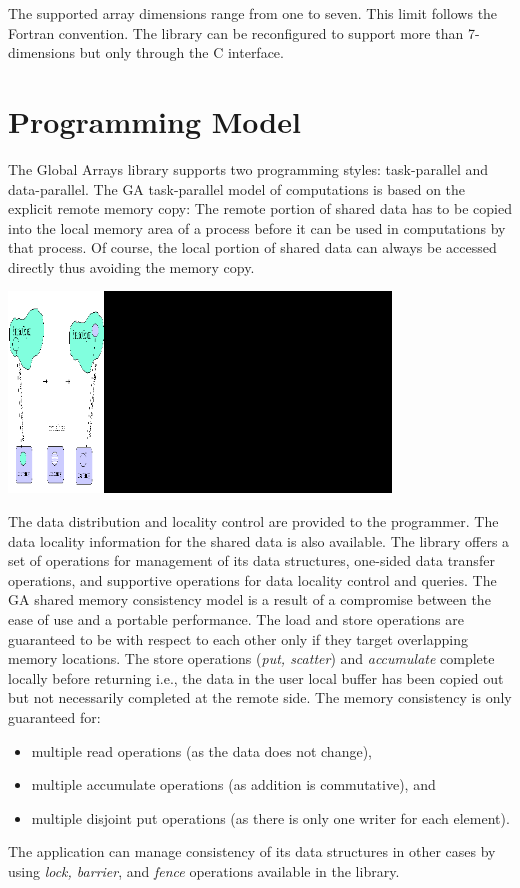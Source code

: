 The supported array dimensions range from one to seven. This limit
follows the Fortran convention. The library can be reconfigured to
support more than 7-dimensions but only through the C interface. 


\section{Programming Model}

The Global Arrays library supports two programming styles: task-parallel
and data-parallel. The GA task-parallel model of computations is based
on the explicit remote memory copy: The remote portion of shared data
has to be copied into the local memory area of a process before it
can be used in computations by that process. Of course, the \textquotedbl{}local\textquotedbl{}
portion of shared data can always be accessed directly thus avoiding
the memory copy. 

\includegraphics[width=4in]{mod}

The data distribution and locality control are provided to the programmer.
The data locality information for the shared data is also available.
The library offers a set of operations for management of its data
structures, one-sided data transfer operations, and supportive operations
for data locality control and queries. The GA shared memory consistency
model is a result of a compromise between the ease of use and a portable
performance. The load and store operations are guaranteed to be 
with respect to each other only if they target overlapping memory
locations. The store operations (\emph{put, scatter}) and \emph{accumulate}
complete locally before returning i.e., the data in the user local
buffer has been copied out but not necessarily completed at the remote
side. The memory consistency is only guaranteed for: 
\begin{itemize}
\item multiple read operations (as the data does not change), 
\item multiple accumulate operations (as addition is commutative), and 
\item multiple disjoint put operations (as there is only one writer for
each element). 
\end{itemize}
The application can manage consistency of its data structures in other
cases by using \emph{lock, barrier}, and \emph{fence} operations available
in the library. 

